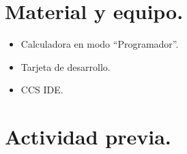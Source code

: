 \documentclass[a4paper,11pt]{article}                 %
\begin{document}
\section{Material y equipo.}
 
\begin{itemize}
	\item Calculadora en modo “Programador”.
	\item Tarjeta de desarrollo.
	\item CCS IDE. 
\end{itemize}
  

  
\section{Actividad previa.}                   
\end{document}
